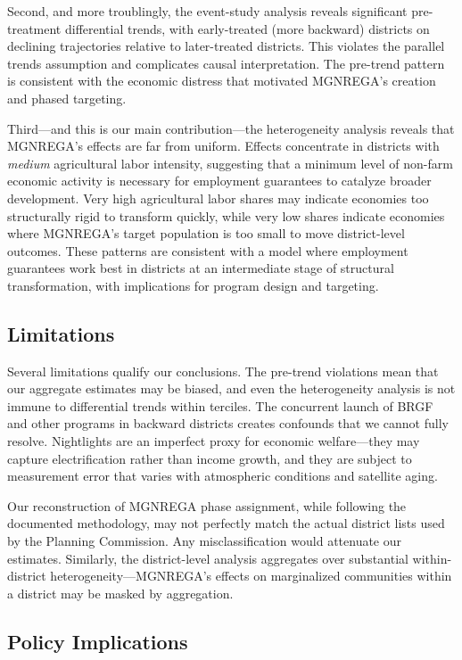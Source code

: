 \documentclass[12pt]{article}
\begin{document}
Second, and more troublingly, the event-study analysis reveals significant pre-treatment differential trends, with early-treated (more backward) districts on declining trajectories relative to later-treated districts. This violates the parallel trends assumption and complicates causal interpretation. The pre-trend pattern is consistent with the economic distress that motivated MGNREGA's creation and phased targeting.

Third---and this is our main contribution---the heterogeneity analysis reveals that MGNREGA's effects are far from uniform. Effects concentrate in districts with \textit{medium} agricultural labor intensity, suggesting that a minimum level of non-farm economic activity is necessary for employment guarantees to catalyze broader development. Very high agricultural labor shares may indicate economies too structurally rigid to transform quickly, while very low shares indicate economies where MGNREGA's target population is too small to move district-level outcomes. These patterns are consistent with a model where employment guarantees work best in districts at an intermediate stage of structural transformation, with implications for program design and targeting.

\subsection{Limitations}

Several limitations qualify our conclusions. The pre-trend violations mean that our aggregate estimates may be biased, and even the heterogeneity analysis is not immune to differential trends within terciles. The concurrent launch of BRGF and other programs in backward districts creates confounds that we cannot fully resolve. Nightlights are an imperfect proxy for economic welfare---they may capture electrification rather than income growth, and they are subject to measurement error that varies with atmospheric conditions and satellite aging.

Our reconstruction of MGNREGA phase assignment, while following the documented methodology, may not perfectly match the actual district lists used by the Planning Commission. Any misclassification would attenuate our estimates. Similarly, the district-level analysis aggregates over substantial within-district heterogeneity---MGNREGA's effects on marginalized communities within a district may be masked by aggregation.

\subsection{Policy Implications}
\end{document}
